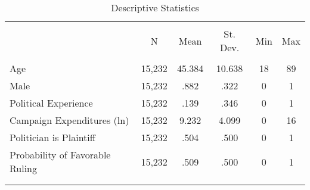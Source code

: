 
\begin{table}[!htbp] \centering
  \caption{Descriptive Statistics}
  \label{tab:sumstats}
\scriptsize
\begin{tabular}{@{\extracolsep{5pt}}lccccc}
\\[-1.8ex]\hline
\hline \\[-1.8ex]
& \multicolumn{1}{c}{N} & \multicolumn{1}{c}{Mean} & \multicolumn{1}{c}{St. Dev.} & \multicolumn{1}{c}{Min} & \multicolumn{1}{c}{Max} \T \B \\
\hline \\[-1.8ex]
Age                             & 15,232 & 45.384 & 10.638 & 18 & 89 \\
Male                            & 15,232 & .882   & .322   & 0  & 1  \\
Political Experience            & 15,232 & .139   & .346   & 0  & 1  \\
Campaign Expenditures (ln)      & 15,232 & 9.232  & 4.099  & 0  & 16 \\
Politician is Plaintiff         & 15,232 & .504   & .500   & 0  & 1  \\
Probability of Favorable Ruling & 15,232 & .509   & .500   & 0  & 1  \\
\\[-1.8ex]\hline
\hline \\[-1.8ex]
\end{tabular}
\end{table}
